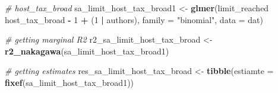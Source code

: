 \documentclass[
]{article}
\newenvironment{Shaded}{\begin{snugshade}}{\end{snugshade}}
\newcommand{\CommentTok}[1]{\textcolor[rgb]{0.56,0.35,0.01}{\textit{#1}}}
\newcommand{\DataTypeTok}[1]{\textcolor[rgb]{0.13,0.29,0.53}{#1}}
\newcommand{\DecValTok}[1]{\textcolor[rgb]{0.00,0.00,0.81}{#1}}
\newcommand{\KeywordTok}[1]{\textcolor[rgb]{0.13,0.29,0.53}{\textbf{#1}}}
\newcommand{\NormalTok}[1]{#1}
\newcommand{\OperatorTok}[1]{\textcolor[rgb]{0.81,0.36,0.00}{\textbf{#1}}}
\newcommand{\StringTok}[1]{\textcolor[rgb]{0.31,0.60,0.02}{#1}}
\begin{document}
\begin{Shaded}
\begin{Highlighting}[]
\CommentTok{# host_tax_broad}
\NormalTok{sa_limit_host_tax_broad1 <-}\StringTok{ }\KeywordTok{glmer}\NormalTok{(limit_reached }\OperatorTok{~}\StringTok{ }\NormalTok{host_tax_broad }\OperatorTok{-}\StringTok{ }\DecValTok{1} \OperatorTok{+}\StringTok{ }\NormalTok{(}\DecValTok{1} \OperatorTok{|}\StringTok{ }\NormalTok{authors), }
    \DataTypeTok{family =} \StringTok{"binomial"}\NormalTok{, }\DataTypeTok{data =}\NormalTok{ dat)}

\CommentTok{# getting marginal R2}
\NormalTok{r2_sa_limit_host_tax_broad <-}\StringTok{ }\KeywordTok{r2_nakagawa}\NormalTok{(sa_limit_host_tax_broad1)}

\CommentTok{# getting estimates}
\NormalTok{res_sa_limit_host_tax_broad <-}\StringTok{ }\KeywordTok{tibble}\NormalTok{(}\DataTypeTok{estiamte =} \KeywordTok{fixef}\NormalTok{(sa_limit_host_tax_broad1))}


\end{Highlighting}
\end{Shaded}
\end{document}
